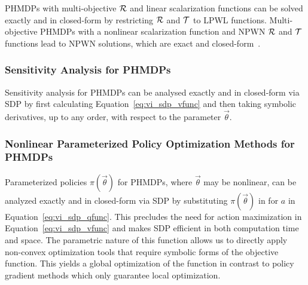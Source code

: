 PHMDPs with multi-objective {\footnotesize $\mathcal{R}$} and linear scalarization functions can be solved exactly and in closed-form by restricting {\footnotesize $\mathcal{R}$} and {\footnotesize $\mathcal{T}$} to LPWL functions. Multi-objective PHMDPs with a nonlinear scalarization function and NPWN {\footnotesize $\mathcal{R}$} and {\footnotesize $\mathcal{T}$} functions lead to NPWN solutions, which are exact and closed-form~\cite{Sanner_UAI_2011}.

\subsubsection{Sensitivity Analysis for PHMDPs}

Sensitivity analysis for PHMDPs can be analysed exactly and in closed-form via SDP by first calculating Equation~\eqref{eq:vi_sdp_vfunc} and then taking symbolic derivatives, up to any order, with respect to the parameter {\footnotesize $\vec{\theta}$}.

\subsubsection{Nonlinear Parameterized Policy Optimization Methods for PHMDPs}

Parameterized policies {\footnotesize $ \pi(\vec{\theta}) $} for PHMDPs, where {\footnotesize $\vec{\theta}$} may be nonlinear, can be analyzed exactly and in closed-form via SDP by substituting {\footnotesize $ \pi(\vec{\theta}) $} in for {\footnotesize  $ a $} in Equation~\eqref{eq:vi_sdp_qfunc}. This precludes the need for action maximization in Equation~\eqref{eq:vi_sdp_vfunc} and makes SDP efficient in both computation time and space. The parametric nature of this function allows us to directly apply non-convex optimization tools that require symbolic forms of the objective function. 
This yields a global optimization of the function in contrast to policy gradient methods which only guarantee local optimization.